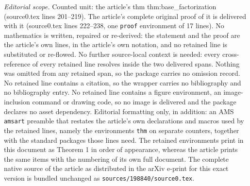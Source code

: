 \documentclass[10pt,a4paper]{amsart}
\begin{document}
\noindent\textit{Editorial scope.} Counted unit: the article's thm thm:base\_factorization (source0.tex lines 201--219). The article's complete original proof of it is delivered with it (source0.tex lines 222--238, one \texttt{proof} environment of 17 lines). No mathematics is written, repaired or re-derived: the statement and the proof are the article's own lines, in the article's own notation, and no retained line is substituted or re-flowed.  No further source-local context is needed: every cross-reference of every retained line resolves inside the two delivered spans.  Nothing was omitted from any retained span, so the package carries no omission record.  No retained line contains a citation, so the wrapper carries no bibliography and no bibliography entry.  No retained line contains a figure environment, an image-inclusion command or drawing code, so no image is delivered and the package declares no asset dependency.  Editorial formatting only, in addition: an AMS \texttt{amsart} preamble that restates the article's own declarations and macros used by the retained lines, namely the environments \texttt{thm} on separate counters, together with the standard packages those lines need.  The retained environments print in this document as Theorem 1 in order of appearance, whereas the article prints the same items with the numbering of its own full document.  The complete native source of the article as distributed in the arXiv e-print for this exact version is bundled unchanged as \texttt{sources/198840/source0.tex}.
\end{document}
